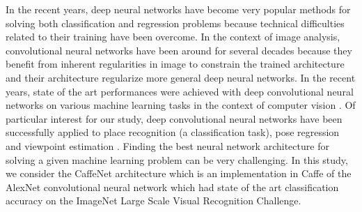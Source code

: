 In the recent years, deep neural networks have become very popular methods for solving both classification and regression problems because technical difficulties related to their training have been overcome. In the context of image analysis, convolutional neural networks have been around for several decades because they benefit from inherent regularities in image to constrain the trained architecture and their architecture regularize more general deep neural networks. In the recent years, state of the art performances were achieved with deep convolutional neural networks on various machine learning tasks in the context of computer vision \cite{NIPS2012_4824,Simonyan14c}. Of particular interest for our study, deep convolutional neural networks have been successfully applied to place recognition \cite{Sunderhauf2015b} (a classification task), pose regression \cite{conf/accv/PfisterSCZ14} and viewpoint estimation \cite{Su2015}. Finding the best neural network architecture for solving a given machine learning problem can be very challenging. In this study, we consider the CaffeNet architecture which is an implementation in Caffe of the AlexNet convolutional neural network\cite{NIPS2012_4824} which had state of the art classification accuracy on the ImageNet Large Scale Visual Recognition Challenge.


